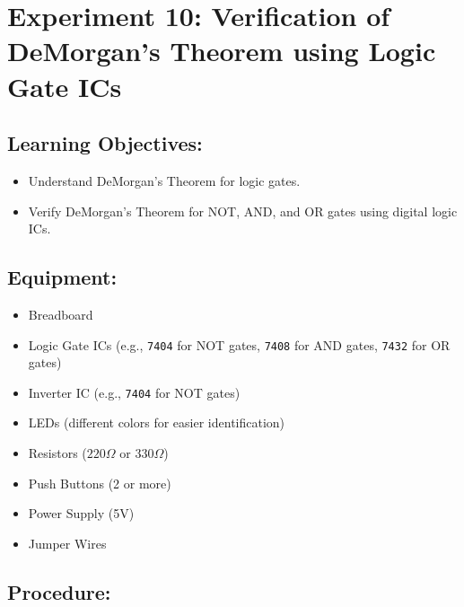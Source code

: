 \section*{Experiment 10: Verification of DeMorgan's Theorem using Logic Gate ICs}  

\subsection*{Learning Objectives:}

\begin{itemize}
    \item Understand DeMorgan's Theorem for logic gates.
    \item Verify DeMorgan's Theorem for NOT, AND, and OR gates using digital logic ICs.
\end{itemize}

\subsection*{Equipment:}

\begin{itemize}
    \item Breadboard
    \item Logic Gate ICs (e.g., \verb|7404| for NOT gates, \verb|7408| for AND gates, \verb|7432| for OR gates)
    \item Inverter IC (e.g., \verb|7404| for NOT gates)
    \item LEDs (different colors for easier identification)
    \item Resistors ($220 \Omega$ or $330\Omega$)
    \item Push Buttons (2 or more)
    \item Power Supply (5V)
    \item Jumper Wires
\end{itemize}

\subsection*{Procedure:}

